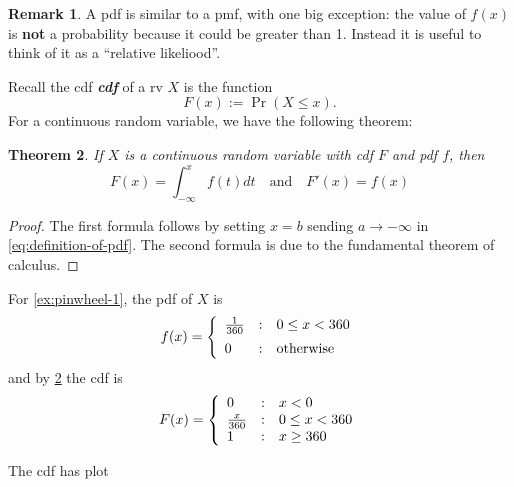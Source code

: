 \documentclass[10pt]{article}
\newtheorem{theorem}{Theorem}
\theoremstyle{definition}
\newtheorem{remark}[theorem]{Remark}
\newcommand{\1}[1]{\textbf{1}_{\left[#1\right]}} %
\def\[{\left [}
\DeclareRobustCommand{\demph}[1]{%
  \ifmmode
  {\color{Blue}#1}%
  \else
  {\color{Blue}\bfseries\slshape #1}%
  \fi
}
\begin{document}
\begin{remark}
  A pdf is similar to a pmf, with one big exception: the value of $f(x)$ is
  \textbf{not} a probability because it could be greater than 1. Instead it is
  useful to think of it as a ``relative likeliood''.
\end{remark}


Recall the \demph{cdf} of a rv $X$ is the function
\begin{equation*}
  F(x) := \Pr\left(X \leq x\right).
\end{equation*}
For a continuous random variable, we have the following theorem:
\begin{theorem}
  \label{thm:fundamental-theorem-calculus-for-F-and-f}
  If $X$ is a continuous random variable with cdf $F$ and pdf $f$, then
  \begin{equation*}
    F(x) = \int_{-\infty}^{x}f(t)dt
    \quad \text{and} \quad 
    F'(x) = f(x)
  \end{equation*}
\end{theorem}
\begin{proof}
  The first formula follows by setting $x=b$ sending $a \to -\infty$ in
  \cref{eq:definition-of-pdf}. The second formula is due to the fundamental
  theorem of calculus.
\end{proof}

For \cref{ex:pinwheel-1}, the pdf of $X$ is
\begin{equation*}
  f(x) = \left\{ \begin{array}{l@{\quad:\quad}l} \frac{1}{360} & 0 \leq x<360\\[.5em] 0& \text{otherwise} \end{array}\right.
\end{equation*}
and by \cref{thm:fundamental-theorem-calculus-for-F-and-f} the cdf is
\begin{equation*}
  F(x) = \left\{ \begin{array}{l@{\quad:\quad}l} 0 & x<0\\ \frac{x}{360}& 0 \leq x<360\\ 1& x \geq 360 \end{array}\right.
\end{equation*}

The cdf has plot
\begin{center}
\end{center}
\end{document}
